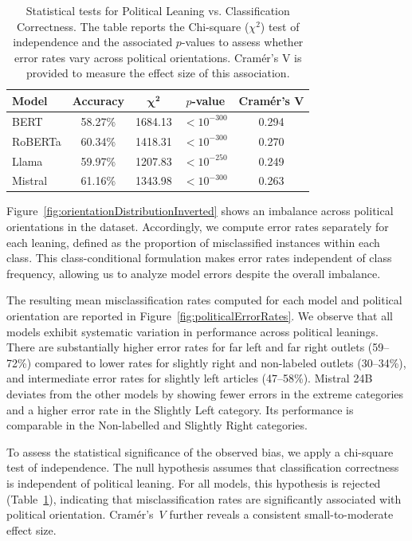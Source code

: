 \documentclass[journal]{IEEEtran}
\begin{document}
\begin{table}[t]
\centering
\begin{tabular}{lcccc}
\textbf{Model} & \textbf{Accuracy} & $\boldsymbol{\chi^2}$ & \textbf{$p$-value} & \textbf{Cramér’s V} \\
\midrule
BERT & 58.27\% & 1684.13 & $<10^{-300}$ & 0.294 \\
RoBERTa & 60.34\% & 1418.31 & $<10^{-300}$ & 0.270 \\
Llama & 59.97\% & 1207.83 & $<10^{-250}$ & 0.249 \\
Mistral & 61.16\% & 1343.98 & $<10^{-300}$ & {0.263} \\
\end{tabular}
\caption{
Statistical tests for Political Leaning vs. Classification Correctness. The table reports the Chi-square ($\chi^2$) test of independence and the associated $p$-values to assess whether error rates vary across political orientations. Cramér’s V is provided to measure the effect size of this association.}
\label{tab:chi_square_results}
\end{table}

Figure~\ref{fig:orientationDistributionInverted} shows an imbalance across political orientations in the dataset. Accordingly, we compute error rates separately for each leaning, defined as the proportion of misclassified instances within each class. This class-conditional formulation makes error rates independent of class frequency, allowing us to analyze model errors despite the overall imbalance.


The resulting mean misclassification rates computed for each model and political orientation are reported in Figure~\ref{fig:politicalErrorRates}. We observe that all models exhibit systematic variation in performance across political leanings. There are substantially higher error rates for far left and far right outlets (59–72\%) compared to lower rates for slightly right and non-labeled outlets (30–34\%), and intermediate error rates for slightly left articles (47–58\%).  Mistral 24B deviates from the other models by showing fewer errors in the extreme categories and a higher error rate in the Slightly Left category. Its performance is comparable in the Non-labelled and Slightly Right categories.


To assess the statistical significance of the observed bias, we apply a chi-square test of independence. The null hypothesis assumes that classification correctness is independent of political leaning. For all models, this hypothesis is rejected (Table~\ref{tab:chi_square_results}), indicating that misclassification rates are significantly associated with political orientation. Cramér’s~$V$ further reveals a consistent small-to-moderate effect size.
\end{document}
